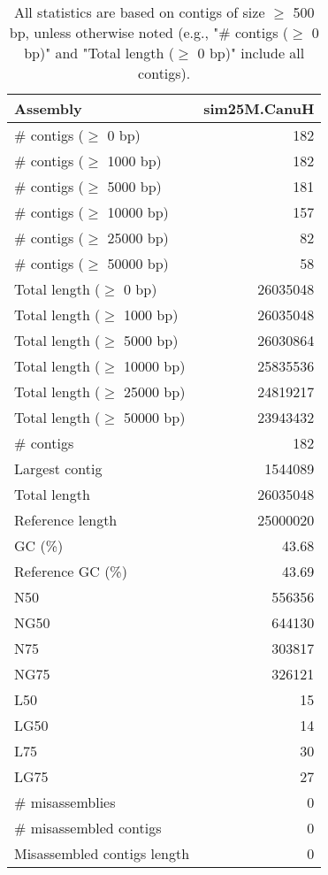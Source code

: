 \documentclass[12pt,a4paper]{article}
\begin{document}
\begin{table}[ht]
\begin{center}
\caption{All statistics are based on contigs of size $\geq$ 500 bp, unless otherwise noted (e.g., "\# contigs ($\geq$ 0 bp)" and "Total length ($\geq$ 0 bp)" include all contigs).}
\begin{tabular}{|l*{1}{|r}|}
\hline
Assembly & sim25M.CanuH \\ \hline
\# contigs ($\geq$ 0 bp) & 182 \\ \hline
\# contigs ($\geq$ 1000 bp) & 182 \\ \hline
\# contigs ($\geq$ 5000 bp) & 181 \\ \hline
\# contigs ($\geq$ 10000 bp) & 157 \\ \hline
\# contigs ($\geq$ 25000 bp) & 82 \\ \hline
\# contigs ($\geq$ 50000 bp) & 58 \\ \hline
Total length ($\geq$ 0 bp) & 26035048 \\ \hline
Total length ($\geq$ 1000 bp) & 26035048 \\ \hline
Total length ($\geq$ 5000 bp) & 26030864 \\ \hline
Total length ($\geq$ 10000 bp) & 25835536 \\ \hline
Total length ($\geq$ 25000 bp) & 24819217 \\ \hline
Total length ($\geq$ 50000 bp) & 23943432 \\ \hline
\# contigs & 182 \\ \hline
Largest contig & 1544089 \\ \hline
Total length & 26035048 \\ \hline
Reference length & 25000020 \\ \hline
GC (\%) & 43.68 \\ \hline
Reference GC (\%) & 43.69 \\ \hline
N50 & 556356 \\ \hline
NG50 & 644130 \\ \hline
N75 & 303817 \\ \hline
NG75 & 326121 \\ \hline
L50 & 15 \\ \hline
LG50 & 14 \\ \hline
L75 & 30 \\ \hline
LG75 & 27 \\ \hline
\# misassemblies & 0 \\ \hline
\# misassembled contigs & 0 \\ \hline
Misassembled contigs length & 0 \\ \hline

\end{tabular}
\end{center}
\end{table}
\end{document}
